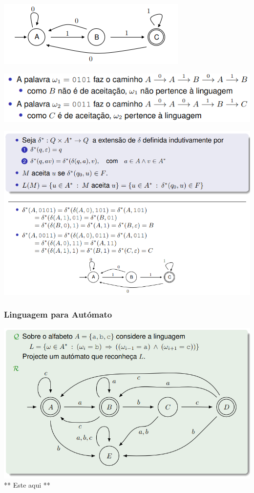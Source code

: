 \documentclass{article}
\begin{document}
\begin{center}
  \includegraphics[scale=0.5]{36}
\end{center}

\begin{center}
  \includegraphics[scale=0.5]{37}
\end{center}

\pagebreak

\begin{center}
  \includegraphics[scale=0.5]{38}
\end{center}

\subsubsection{Linguagem para Autómato}

\begin{center}
  \includegraphics[scale=0.4]{39}
  \break
  \textcolor{BrickRed}{** Este aqui **}
\end{center}
\end{document}
